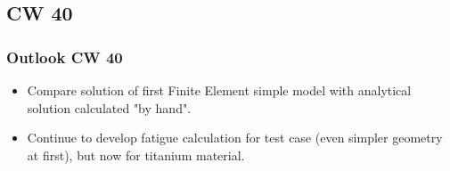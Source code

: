 \subsection{CW 40}
\begin{frame}
  \frametitle{Outlook CW 40}
	\begin{itemize}
		\item Compare solution of first Finite Element simple model with analytical solution calculated "by hand".
		\item Continue to develop fatigue calculation for test case (even simpler geometry at first), but now for titanium material. 
	\end{itemize}
\end{frame}

